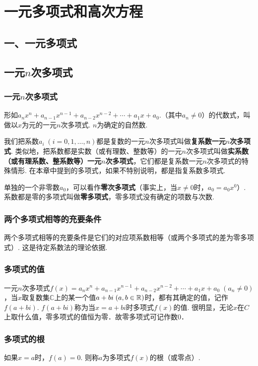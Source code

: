\chapter{一元多项式和高次方程}

\section*{一、一元多项式}

\section{一元$n$次多项式}

\subsection{一元$n$次多项式}

形如$a_nx^n+a_{n-1}x^{n-1}+a_{n-2}x^{n-2}+\cdots+a_1x+a_0$.（其中$a_n\ne 0$）的代数式，叫做以$x$为元的一元$n$次多项式. $n$为确定的自然数.

我们把系数$a_i\; (i=0,1,\ldots,n)$都是复数的一元$n$次多项式叫做\textbf{复系数一元$n$次多项式}. 类似地，把系数都是实数（或有理数、整数等）的一元$n$次多项式叫做\textbf{实系数（或有理系数、整系数等）一元$n$次多项式}，它们都是复系数一元$n$次多项式的特殊情形. 在本章中提到的多项式，如果不特别说明，都是指复系数多项式.

单独的一个非零数$a_0$，可以看作\textbf{零次多项式}（事实上，当$x\ne 0$时，$a_0=a_0x^0$）. 系数都是零的多项式叫做\textbf{零多项式}，零多项式没有确定的项数与次数.

\subsection{两个多项式相等的充要条件}

两个多项式相等的充要条件是它们的对应项系数相等（或两个多项式的差为零多项式）. 这是待定系数法的理论依据.

\subsection{多项式的值}
一元$n$次多项式$f(x)=a_nx^n+a_{n-1}x^{n-1}+a_{n-2}x^{n-2}+\cdots+a_1x+a_0\; (a_n\ne 0)$，当$x$取复数集$\mathbb{C}$上的某一个值$a+bi\; (a,b\in\mathbb{R})$时，都有其确定的值，记作$f(a+bi)$. $f(a+bi)$称为当$x=a+bi$时多项式$f(x)$的值. 很明显，无论$x$在$C$上取什么值，零多项式的值恒为零．故零多项式可记作数0．

\subsection{多项式的根}
如果$x=a$时，$f(a)=0$. 则称$a$为多项式$f(x)$的根（或零点）.

